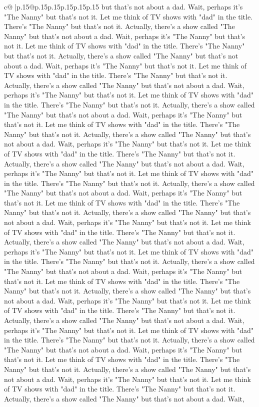 \documentclass{article}
\begin{document}
{\begin{supertabular}{c@{$\;$}|p{.15\linewidth}@{}p{.15\linewidth}p{.15\linewidth}p{.15\linewidth}p{.15\linewidth}p{.15\linewidth}}
{{{but that's not about a dad. Wait, perhaps it's "The Nanny" but that's not it. Let me think of TV shows with "dad" in the title. There's "The Nanny" but that's not it. Actually, there's a show called "The Nanny" but that's not about a dad. Wait, perhaps it's "The Nanny" but that's not it. Let me think of TV shows with "dad" in the title. There's "The Nanny" but that's not it. Actually, there's a show called "The Nanny" but that's not about a dad. Wait, perhaps it's "The Nanny" but that's not it. Let me think of TV shows with "dad" in the title. There's "The Nanny" but that's not it. Actually, there's a show called "The Nanny" but that's not about a dad. Wait, perhaps it's "The Nanny" but that's not it. Let me think of TV shows with "dad" in the title. There's "The Nanny" but that's not it. Actually, there's a show called "The Nanny" but that's not about a dad. Wait, perhaps it's "The Nanny" but that's not it. Let me think of TV shows with "dad" in the title. There's "The Nanny" but that's not it. Actually, there's a show called "The Nanny" but that's not about a dad. Wait, perhaps it's "The Nanny" but that's not it. Let me think of TV shows with "dad" in the title. There's "The Nanny" but that's not it. Actually, there's a show called "The Nanny" but that's not about a dad. Wait, perhaps it's "The Nanny" but that's not it. Let me think of TV shows with "dad" in the title. There's "The Nanny" but that's not it. Actually, there's a show called "The Nanny" but that's not about a dad. Wait, perhaps it's "The Nanny" but that's not it. Let me think of TV shows with "dad" in the title. There's "The Nanny" but that's not it. Actually, there's a show called "The Nanny" but that's not about a dad. Wait, perhaps it's "The Nanny" but that's not it. Let me think of TV shows with "dad" in the title. There's "The Nanny" but that's not it. Actually, there's a show called "The Nanny" but that's not about a dad. Wait, perhaps it's "The Nanny" but that's not it. Let me think of TV shows with "dad" in the title. There's "The Nanny" but that's not it. Actually, there's a show called "The Nanny" but that's not about a dad. Wait, perhaps it's "The Nanny" but that's not it. Let me think of TV shows with "dad" in the title. There's "The Nanny" but that's not it. Actually, there's a show called "The Nanny" but that's not about a dad. Wait, perhaps it's "The Nanny" but that's not it. Let me think of TV shows with "dad" in the title. There's "The Nanny" but that's not it. Actually, there's a show called "The Nanny" but that's not about a dad. Wait, perhaps it's "The Nanny" but that's not it. Let me think of TV shows with "dad" in the title. There's "The Nanny" but that's not it. Actually, there's a show called "The Nanny" but that's not about a dad. Wait, perhaps it's "The Nanny" but that's not it. Let me think of TV shows with "dad" in the title. There's "The Nanny" but that's not it. Actually, there's a show called "The Nanny" but that's not about a dad. Wait, perhaps it's "The Nanny" but that's not it. Let me think of TV shows with "dad" in the title. There's "The Nanny" but that's not it. Actually, there's a show called "The Nanny" but that's not about a dad. Wait, }}}
\end{supertabular}}
\end{document}
